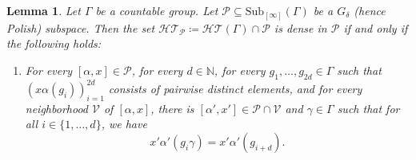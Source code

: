 \documentclass[12pt]{article}
\numberwithin{equation}{section}
\newtheorem{lemma}[equation]{Lemma}
\theoremstyle{definition}
\newcommand{\N}{\mathbb{N}}
\newcommand{\Sub}{\mathrm{Sub}}
\begin{document}
\begin{lemma}\label{lem: HT and Baire}
	Let \( \Gamma \) be a countable group. 
	Let \(\mathcal P \subseteq \Sub_{[\infty]}(\Gamma)\) be a \( G_\delta \) (hence Polish) subspace.
	Then the set \(\mathcal{HT}_{\mathcal P}\coloneqq \mathcal{HT}(\Gamma)\cap \mathcal P\) is dense in \(\mathcal P\)
	if and only if the following holds:
	\begin{enumerate}
	\item[(\textasteriskcentered)]%
	For every \([\alpha,x]\in \mathcal P \),
	 for every \( d\in\N \), for every \( g_1,\dots,g_{2d}\in \Gamma \) such that \({(x\alpha(g_i))}_{i=1}^{2d}\)
	consists of pairwise distinct elements, and for every neighborhood \(\mathcal V\)
	of \([\alpha,x]\), there is \([\alpha',x']\in\mathcal P\cap \mathcal V\) and 
	\( \gamma\in \Gamma \) such that for all \( i\in \{1,\dots,d\} \), we have
	\[
	x'\alpha'(g_i\gamma)=x'\alpha'(g_{i+d}).
	\]
\end{enumerate}

\end{lemma}
\end{document}
